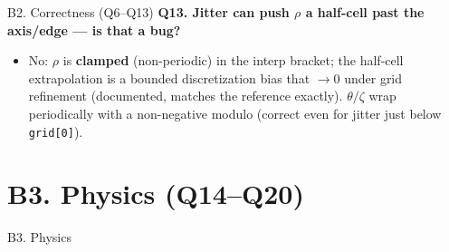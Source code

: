 \documentclass[11pt,aspectratio=169]{beamer}
\newcommand{\qitem}[1]{\medskip\textbf{#1}\par}
\begin{document}
\begin{frame}[allowframebreaks]{B2. Correctness (Q6--Q13)}
\qitem{Q13. Jitter can push $\rho$ a half-cell past the axis/edge --- is that a bug?}
\begin{itemize}
\item No: $\rho$ is \textbf{clamped} (non-periodic) in the interp bracket; the half-cell
      extrapolation is a bounded discretization bias that $\to 0$ under grid refinement
      (documented, matches the reference exactly). $\theta/\zeta$ wrap periodically with a
      non-negative modulo (correct even for jitter just below \texttt{grid[0]}).
\end{itemize}
\end{frame}

\section{B3. Physics (Q14--Q20)}
\begin{frame}
\centering\vfill
{\Large\color{key} B3. Physics}\par
{}
\vfill
\end{frame}
\end{document}
